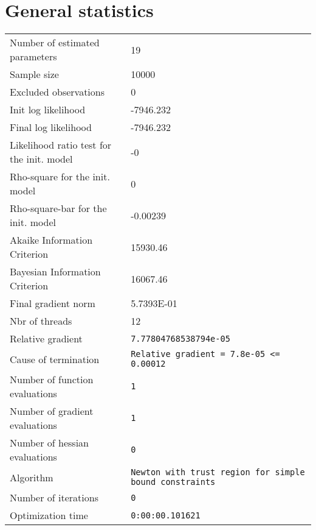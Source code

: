 



\section{General statistics}
\begin{tabular}{ll}
Number of estimated parameters & 19 \\
Sample size & 10000 \\
Excluded observations & 0 \\
Init log likelihood & -7946.232 \\
Final log likelihood & -7946.232 \\
Likelihood ratio test for the init. model & -0 \\
Rho-square for the init. model & 0 \\
Rho-square-bar for the init. model & -0.00239 \\
Akaike Information Criterion & 15930.46 \\
Bayesian Information Criterion & 16067.46 \\
Final gradient norm & 5.7393E-01 \\
Nbr of threads & 12 \\
Relative gradient & \verb$7.77804768538794e-05$ \\
Cause of termination & \verb$Relative gradient = 7.8e-05 <= 0.00012$ \\
Number of function evaluations & \verb$1$ \\
Number of gradient evaluations & \verb$1$ \\
Number of hessian evaluations & \verb$0$ \\
Algorithm & \verb$Newton with trust region for simple bound constraints$ \\
Number of iterations & \verb$0$ \\
Optimization time & \verb$0:00:00.101621$ \\
\end{tabular}

